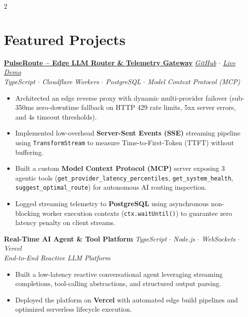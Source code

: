 \documentclass[10pt,letterpaper]{article}
\newcommand{\project}[3]{
    \textbf{#1} \hfill \textit{\small #2} \\
    \textit{\footnotesize #3} \vspace{1pt}
}
\begin{document}
\begin{paracol}{2}
\vspace{3pt}

\section{Featured Projects}

\project{\href{https://github.com/nagulapellysaikrishna/pulseroute}{PulseRoute -- Edge LLM Router \& Telemetry Gateway}}{\href{https://github.com/nagulapellysaikrishna/pulseroute}{GitHub} $\cdot$ \href{https://pulseroute.your-subdomain.workers.dev}{Live Demo}}{TypeScript $\cdot$ Cloudflare Workers $\cdot$ PostgreSQL $\cdot$ Model Context Protocol (MCP)}
\begin{itemize}
    \item Architected an edge reverse proxy with dynamic multi-provider failover (sub-350ms zero-downtime fallback on HTTP 429 rate limits, 5xx server errors, and 4s timeout thresholds).
    \item Implemented low-overhead \textbf{Server-Sent Events (SSE)} streaming pipeline using \texttt{TransformStream} to measure Time-to-First-Token (TTFT) without buffering.
    \item Built a custom \textbf{Model Context Protocol (MCP)} server exposing 3 agentic tools (\texttt{get\_provider\_latency\_percentiles}, \texttt{get\_system\_health}, \texttt{suggest\_optimal\_route}) for autonomous AI routing inspection.
    \item Logged streaming telemetry to \textbf{PostgreSQL} using asynchronous non-blocking worker execution contexts (\texttt{ctx.waitUntil()}) to guarantee zero latency penalty on client streams.
\end{itemize}

\vspace{3pt}

\project{Real-Time AI Agent \& Tool Platform}{TypeScript $\cdot$ Node.js $\cdot$ WebSockets $\cdot$ Vercel}{End-to-End Reactive LLM Platform}
\begin{itemize}
    \item Built a low-latency reactive conversational agent leveraging streaming completions, tool-calling abstractions, and structured output parsing.
    \item Deployed the platform on \textbf{Vercel} with automated edge build pipelines and optimized serverless lifecycle execution.
\end{itemize}

\switchcolumn


\end{paracol}
\end{document}
